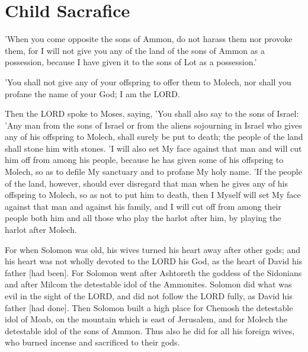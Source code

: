 \chapter{Child Sacrafice}


\begin{scripture}[Deuteronomy 2:19]
    'When you come opposite the sons of Ammon, do not harass them nor provoke them, for I will not give you any of the land of the sons of Ammon as a possession, because I have given it to the sons of Lot as a possession.'
\end{scripture}

\vspace{2\baselineskip}

\begin{scripture}[Leviticus 18:21]
    'You shall not give any of your offspring to offer them to Molech, nor shall you profane the name of your God; I am the LORD.
\end{scripture}

\vspace{2\baselineskip}

\begin{scripture}[Leviticus 20:1-5]
    Then the LORD spoke to Moses, saying,
    'You shall also say to the sons of Israel: 'Any man from the sons of Israel or from the aliens sojourning in Israel who gives any of his offspring to Molech, shall surely be put to death; the people of the land shall stone him with stones.
    'I will also set My face against that man and will cut him off from among his people, because he has given some of his offspring to Molech, so as to defile My sanctuary and to profane My holy name.
    'If the people of the land, however, should ever disregard that man when he gives any of his offspring to Molech, so as not to put him to death,
    then I Myself will set My face against that man and against his family, and I will cut off from among their people both him and all those who play the harlot after him, by playing the harlot after Molech.
\end{scripture}

\vspace{2\baselineskip}

\begin{scripture}[1 Kings 11:4-8]
    For when Solomon was old, his wives turned his heart away after other gods; and his heart was not wholly devoted to the LORD his God, as the heart of David his father [had been].
    For Solomon went after Ashtoreth the goddess of the Sidonians and after Milcom the detestable idol of the Ammonites.
    Solomon did what was evil in the sight of the LORD, and did not follow the LORD fully, as David his father [had done].
    Then Solomon built a high place for Chemosh the detestable idol of Moab, on the mountain which is east of Jerusalem, and for Molech the detestable idol of the sons of Ammon.
    Thus also he did for all his foreign wives, who burned incense and sacrificed to their gods.
\end{scripture}

